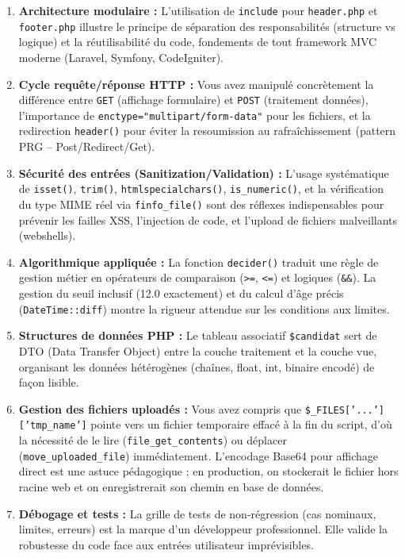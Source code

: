 \documentclass[11pt]{article}
\begin{document}
\begin{enumerate}
    \item \textbf{Architecture modulaire :} L'utilisation de \texttt{include} pour \texttt{header.php} et \texttt{footer.php} illustre le principe de séparation des responsabilités (structure vs logique) et la réutilisabilité du code, fondements de tout framework MVC moderne (Laravel, Symfony, CodeIgniter).
    \item \textbf{Cycle requête/réponse HTTP :} Vous avez manipulé concrètement la différence entre \texttt{GET} (affichage formulaire) et \texttt{POST} (traitement données), l'importance de \texttt{enctype="multipart/form-data"} pour les fichiers, et la redirection \texttt{header()} pour éviter la resoumission au rafraîchissement (pattern PRG -- Post/Redirect/Get).
    \item \textbf{Sécurité des entrées (Sanitization/Validation) :} L'usage systématique de \texttt{isset()}, \texttt{trim()}, \texttt{htmlspecialchars()}, \texttt{is\_numeric()}, et la vérification du type MIME réel via \texttt{finfo\_file()} sont des réflexes indispensables pour prévenir les failles XSS, l'injection de code, et l'upload de fichiers malveillants (webshells).
    \item \textbf{Algorithmique appliquée :} La fonction \texttt{decider()} traduit une règle de gestion métier en opérateurs de comparaison (\texttt{>=}, \texttt{<=}) et logiques (\texttt{\&\&}). La gestion du seuil inclusif (12.0 exactement) et du calcul d'âge précis (\texttt{DateTime::diff}) montre la rigueur attendue sur les conditions aux limites.
    \item \textbf{Structures de données PHP :} Le tableau associatif \texttt{\$candidat} sert de DTO (Data Transfer Object) entre la couche traitement et la couche vue, organisant les données hétérogènes (chaînes, float, int, binaire encodé) de façon lisible.
    \item \textbf{Gestion des fichiers uploadés :} Vous avez compris que \texttt{\$\_FILES['...']['tmp\_name']} pointe vers un fichier temporaire effacé à la fin du script, d'où la nécessité de le lire (\texttt{file\_get\_contents}) ou déplacer (\texttt{move\_uploaded\_file}) immédiatement. L'encodage Base64 pour affichage direct est une astuce pédagogique ; en production, on stockerait le fichier hors racine web et on enregistrerait son chemin en base de données.
    \item \textbf{Débogage et tests :} La grille de tests de non-régression (cas nominaux, limites, erreurs) est la marque d'un développeur professionnel. Elle valide la robustesse du code face aux entrées utilisateur imprévisibles.
\end{enumerate}
\end{document}
